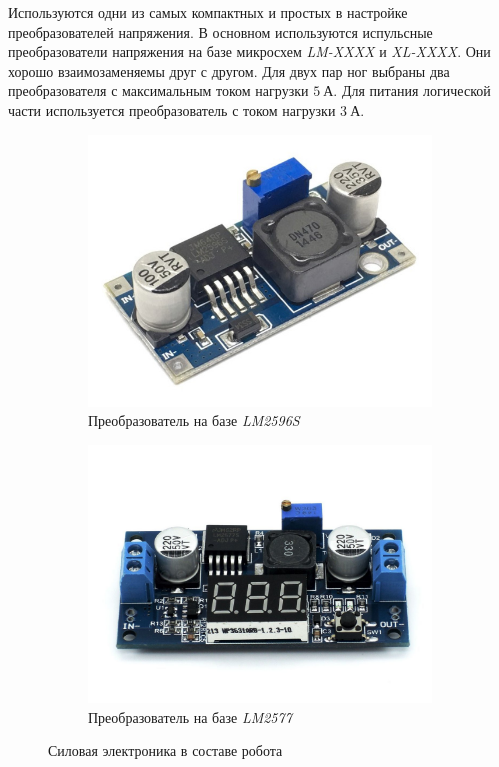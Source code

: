 Используются одни из самых компактных и простых в настройке преобразователей напряжения. В основном используются испульсные преобразователи напряжения на базе микросхем \textit{LM-XXXX} и \textit{XL-XXXX}. Они хорошо взаимозаменяемы друг с другом. Для двух пар ног выбраны два преобразователя с максимальным током нагрузки $ 5 \: А $. Для питания логической части используется преобразователь с током нагрузки $ 3 \: А $.
\begin{figure}[ht]
    \centering
    \begin{subfigure}[b]{0.45\textwidth}    
        \centering
        \includegraphics[scale=0.30]{chapter_mechanics_construction/figure4.jpg}
        \caption{Преобразователь на базе \textit{LM2596S}}
    \end{subfigure}
    \begin{subfigure}[b]{0.45\textwidth}
        \centering
        \includegraphics[scale=0.15]{chapter_mechanics_construction/figure5.jpg}
        \caption{Преобразователь на базе \textit{LM2577}}
    \end{subfigure}
     
    \caption{Силовая электроника в составе робота}
    \label{}
\end{figure}

